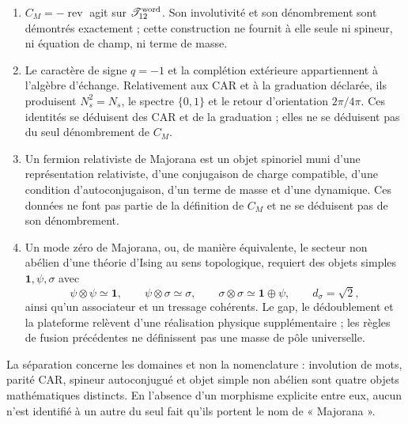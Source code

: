 \begin{enumerate}
 \item \(C_M=-\operatorname{rev}\) agit sur \(\mathscr T_{12}^{\rm word}\). Son involutivité et son dénombrement sont démontrés exactement ; cette construction ne fournit à elle seule ni spineur, ni équation de champ, ni terme de masse.

 \item Le caractère de signe \(q=-1\) et la complétion extérieure appartiennent à l’algèbre d’échange. Relativement aux CAR et à la graduation déclarée, ils produisent \(N_s^2=N_s\), le spectre \(\{0,1\}\) et le retour d’orientation \(2\pi/4\pi\). Ces identités se déduisent des CAR et de la graduation ; elles ne se déduisent pas du seul dénombrement de \(C_M\).

 \item Un fermion relativiste de Majorana est un objet spinoriel muni d’une représentation relativiste, d’une conjugaison de charge compatible, d’une condition d’autoconjugaison, d’un terme de masse et d’une dynamique. Ces données ne font pas partie de la définition de \(C_M\) et ne se déduisent pas de son dénombrement.

 \item Un mode zéro de Majorana, ou, de manière équivalente, le secteur non abélien d’une théorie d’Ising au sens topologique, requiert des objets simples \(\mathbf 1,\psi,\sigma\) avec
 \[
  \psi\otimes\psi\simeq\mathbf 1,\qquad
  \psi\otimes\sigma\simeq\sigma,\qquad
  \sigma\otimes\sigma\simeq\mathbf 1\oplus\psi,\qquad
  d_\sigma=\sqrt2,
 \]
 ainsi qu’un associateur et un tressage cohérents. Le gap, le dédoublement et la plateforme relèvent d’une réalisation physique supplémentaire ; les règles de fusion précédentes ne définissent pas une masse de pôle universelle.
\end{enumerate}

La séparation concerne les domaines et non la nomenclature : involution de mots, parité CAR, spineur autoconjugué et objet simple non abélien sont quatre objets mathématiques distincts. En l’absence d’un morphisme explicite entre eux, aucun n’est identifié à un autre du seul fait qu’ils portent le nom de « Majorana ».
